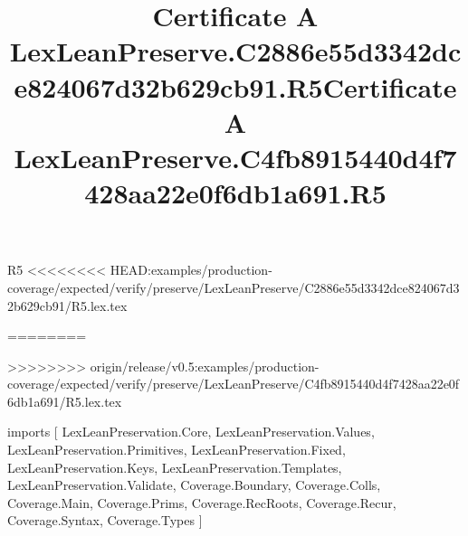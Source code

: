 \begin{lexlean}{R5}
<<<<<<<< HEAD:examples/production-coverage/expected/verify/preserve/LexLeanPreserve/C2886e55d3342dce824067d32b629cb91/R5.lex.tex
\title{Certificate A LexLeanPreserve.C2886e55d3342dce824067d32b629cb91.R5}
========
\title{Certificate A LexLeanPreserve.C4fb8915440d4f7428aa22e0f6db1a691.R5}
>>>>>>>> origin/release/v0.5:examples/production-coverage/expected/verify/preserve/LexLeanPreserve/C4fb8915440d4f7428aa22e0f6db1a691/R5.lex.tex
\begin{coremodule}
imports [
  LexLeanPreservation.Core,
  LexLeanPreservation.Values,
  LexLeanPreservation.Primitives,
  LexLeanPreservation.Fixed,
  LexLeanPreservation.Keys,
  LexLeanPreservation.Templates,
  LexLeanPreservation.Validate,
  Coverage.Boundary,
  Coverage.Colls,
  Coverage.Main,
  Coverage.Prims,
  Coverage.RecRoots,
  Coverage.Recur,
  Coverage.Syntax,
  Coverage.Types
]


\end{coremodule}
\end{lexlean}
